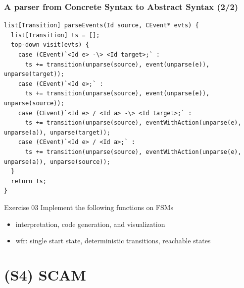 \documentclass{beamer}
\begin{document}
\begin{frame}[fragile]
\frametitle{A parser from Concrete Syntax to Abstract Syntax (2/2)}

\begin{lstlisting}[language=Rascal]
list[Transition] parseEvents(Id source, CEvent* evts) {
  list[Transition] ts = [];
  top-down visit(evts) {
    case (CEvent)`<Id e> -\> <Id target>;` : 
      ts += transition(unparse(source), event(unparse(e)), unparse(target));
    case (CEvent)`<Id e>;` : 
      ts += transition(unparse(source), event(unparse(e)), unparse(source));
    case (CEvent)`<Id e> / <Id a> -\> <Id target>;` : 
      ts += transition(unparse(source), eventWithAction(unparse(e), unparse(a)), unparse(target));
    case (CEvent)`<Id e> / <Id a>;` : 
      ts += transition(unparse(source), eventWithAction(unparse(e), unparse(a)), unparse(source));
  }
  return ts;
}
\end{lstlisting}

\end{frame}

\begin{frame}

  \begin{block}{Exercise 03}
    Implement the following functions on FSMs
    \begin{itemize}
      \item interpretation, code generation, and visualization
      \item wfr: single start state, deterministic transitions, reachable states
    \end{itemize}
  \end{block}
\end{frame}

\section{(S4) SCAM}

\end{document}

